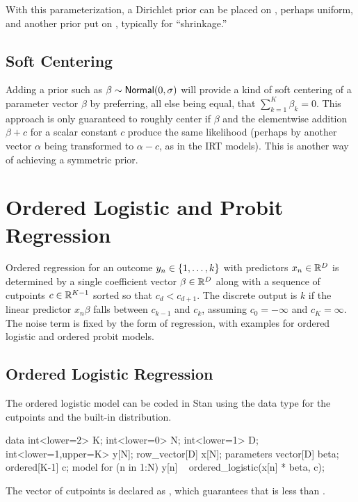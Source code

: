 With this parameterization, a Dirichlet prior can be placed on
, perhaps uniform, and another prior put on
, typically for ``shrinkage.''


\subsection{Soft Centering}

Adding a prior such as $\beta \sim \mbox{\sf Normal}(0,\sigma)$ will provide a kind
of soft centering of a parameter vector $\beta$ by preferring, all
else being equal, that $\sum_{k=1}^K \beta_k = 0$.  This approach is only
guaranteed to roughly center  if $\beta$ and the elementwise addition $\beta + c$
for a scalar constant $c$ produce the same likelihood (perhaps by
another vector $\alpha$ being transformed to $\alpha - c$, as in the
IRT models).  This is another way of achieving a symmetric prior.


\section{Ordered Logistic and Probit Regression}\label{ordered-logistic.section}

Ordered regression for an outcome $y_n \in \{ 1,\ldots, k \}$ with
predictors $x_n \in \mathbb{R}^D$ is determined by a single coefficient
vector $\beta \in \mathbb{R}^D$ along with a sequence of cutpoints $c \in
\mathbb{R}^{K-1}$ sorted so that $c_d < c_{d+1}$.  The discrete output is
$k$ if the linear predictor $x_n \beta$ falls between $c_{k-1}$ and
$c_k$, assuming $c_0 = -\infty$ and $c_K = \infty$.  The noise term is
fixed by the form of regression, with examples for ordered logistic
and ordered probit models.

\subsection{Ordered Logistic Regression}

The ordered logistic model can be coded in Stan using the
 data type for the cutpoints and the built-in
 distribution.
%

\begin{stancode}
data {
  int<lower=2> K;
  int<lower=0> N;
  int<lower=1> D;
  int<lower=1,upper=K> y[N];
  row_vector[D] x[N];
}
parameters {
  vector[D] beta;
  ordered[K-1] c;
}
model {
  for (n in 1:N)
    y[n] ~ ordered_logistic(x[n] * beta, c);
}
\end{stancode}
%
The vector of cutpoints  is declared as ,
which guarantees that  is less than .

